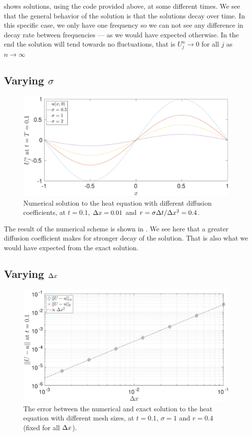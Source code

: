 \documentclass[11pt,letter, swedish, english
]{article}
\begin{document}
 shows solutions, using the code provided above, at some
different times. We see that the general behavior of the solution is
that the solutions decay over time. In this specific case, we only
have one frequency so we can not see any difference in decay rate
between frequencies --- as we would have expected otherwise. In the
end the solution will tend towards no fluctuations, that is $U_j^n\to
0$ for all $j$ as $n\to\infty$


\subsection{Varying $\sigma$}
\begin{figure}\centering
\includegraphics[width=1\textwidth]{4b.eps}
\caption{Numerical solution to the heat equation with different
  diffusion coefficients,
  at $t=0.1$, $\Delta{x}=0.01$ and $r=\sigma\Delta{t}/\Delta{x}^2=0.4$. }
\label{fig:4b}
\end{figure}

The result of the numerical scheme is shown in .
We see here that a greater diffusion coefficient makes for stronger
decay of the solution. That is also what we would have expected from
the exact solution.

\subsection{Varying $\Delta{x}$}
\begin{figure}\centering
\includegraphics[width=1\textwidth]{4c.eps}
\caption{The error between the numerical and exact solution to the
  heat equation with different mesh sizes, at $t=0.1$, $\sigma=1$ and
  $r=0.4$ (fixed for all $\Delta{x}$). }
\label{fig:4c}
\end{figure}
\end{document}
